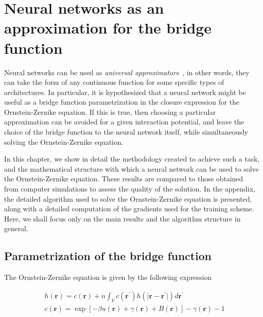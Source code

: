 \newcommand{\vecr}{\mathbf{r}}
\newcommand{\veck}{\mathbf{k}}
\newcommand{\nnet}{N_{\theta}(\mathbf{r})}
\chapter{Neural networks as an approximation for the bridge function} %

\label{Cap3}


Neural networks can be used as \emph{universal approximators}~\cite{hornikMultilayerFeedforwardNetworks1989, hornikApproximationCapabilitiesMultilayer1991, cybenkoApproximationSuperpositionsSigmoidal1989},
in other words, they can take the form of any continuous function for some specific
types of architectures.
In particular, it is hypothesized that a neural network might be useful as a bridge function
parametrization in the closure expression for the Ornstein-Zernike equation. If this is true,
then choosing a particular approximation can be avoided for a given interaction potential, 
and leave the choice of the bridge function to the neural network itself, while
simultaneously solving the Ornstein-Zernike equation.

In this chapter, we show in detail the methodology created to achieve such a task, and
the mathematical structure with which a neural network can be used to solve the
Ornstein-Zernike equation.
These results are compared to those obtained from computer simulations to assess the
quality of the solution.
In the appendix, the detailed algorithm used to solve the Ornstein-Zernike equation
is presented, along with a detailed computation of the gradients used for the
training scheme. Here, we shall focus only on the main results and the algorithm structure
in general.

\section{Parametrization of the bridge function}

The Ornstein-Zernike equation is given by the following expression

\begin{subequations}
    \begin{align*}
         & h(\vecr) = c(\vecr) +
        n \int_{V}
        c(\vecr^{\prime})
        h(\lvert \vecr - \vecr^{\prime} \rvert)
        d\vecr^{\prime} \label{eq:oz1} \\
         & c(\vecr)
        = \exp{\left[
                -  \beta u(\vecr)
                +  \gamma(\vecr)
                + B(\vecr)
                \right]} -
        \gamma(\vecr)
        - 1
    \end{align*}
\end{subequations}

